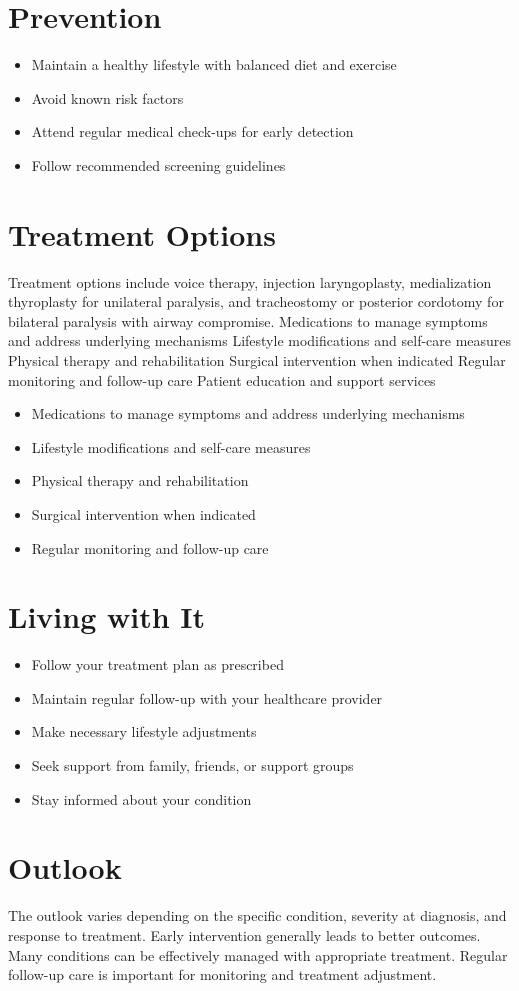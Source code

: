 \section{Prevention}
\begin{itemize}[noitemsep]
  \item Maintain a healthy lifestyle with balanced diet and exercise
  \item Avoid known risk factors
  \item Attend regular medical check-ups for early detection
  \item Follow recommended screening guidelines
\end{itemize}
\section{Treatment Options}
Treatment options include voice therapy, injection laryngoplasty, medialization thyroplasty for unilateral paralysis, and tracheostomy or posterior cordotomy for bilateral paralysis with airway compromise. Medications to manage symptoms and address underlying mechanisms Lifestyle modifications and self-care measures Physical therapy and rehabilitation Surgical intervention when indicated Regular monitoring and follow-up care Patient education and support services

\begin{itemize}[noitemsep]
  \item Medications to manage symptoms and address underlying mechanisms
  \item Lifestyle modifications and self-care measures
  \item Physical therapy and rehabilitation
  \item Surgical intervention when indicated
  \item Regular monitoring and follow-up care
\end{itemize}
\section{Living with It}
\begin{itemize}[noitemsep]
  \item Follow your treatment plan as prescribed
  \item Maintain regular follow-up with your healthcare provider
  \item Make necessary lifestyle adjustments
  \item Seek support from family, friends, or support groups
  \item Stay informed about your condition
\end{itemize}
\section{Outlook}
The outlook varies depending on the specific condition, severity at diagnosis, and response to treatment. Early intervention generally leads to better outcomes. Many conditions can be effectively managed with appropriate treatment. Regular follow-up care is important for monitoring and treatment adjustment.
